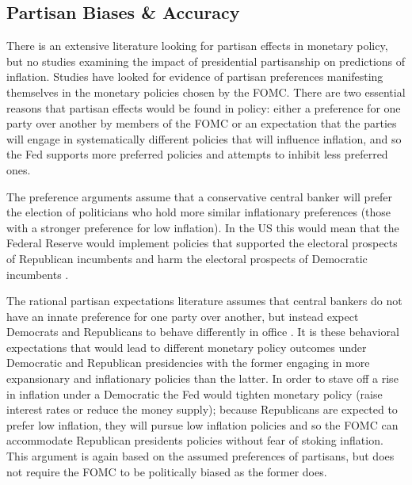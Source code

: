 \documentclass[a4paper]{article}
\begin{document}


\subsection{Partisan Biases \& Accuracy}

There is an extensive literature looking for partisan effects in monetary policy, but no studies examining the impact of presidential partisanship on predictions of inflation. Studies have looked for evidence of partisan preferences manifesting themselves in the monetary policies chosen by the FOMC. There are two essential reasons that partisan effects would be found in policy: either a preference for one party over another by members of the FOMC or an expectation that the parties will engage in systematically different policies that will influence inflation, and so the Fed supports more preferred policies and attempts to inhibit less preferred ones. 

The preference arguments assume that a conservative central banker will prefer the election of politicians who hold more similar inflationary preferences (those with a stronger preference for low inflation). In the US this would mean that the Federal Reserve would implement policies that supported the electoral prospects of Republican incumbents and harm the electoral prospects of Democratic incumbents \citep{Clark2012,Hakes1988,Sieg1997,Tootell1996}.

The rational partisan expectations literature assumes that central bankers do not have an innate preference for one party over another, but instead expect Democrats and Republicans to behave differently in office \citep{Alesina1991,Hibbs1994}. It is these behavioral expectations that would lead to different monetary policy outcomes under Democratic and Republican presidencies with the former engaging in more expansionary and inflationary policies than the latter. In order to stave off a rise in inflation under a Democratic the Fed would tighten monetary policy (raise interest rates or reduce the money supply); because Republicans are expected to prefer low inflation, they will pursue low inflation policies and so the FOMC can accommodate Republican presidents policies without fear of stoking inflation. This argument is again based on the assumed preferences of partisans, but does not require the FOMC to be politically biased as the former does. 
\end{document}
